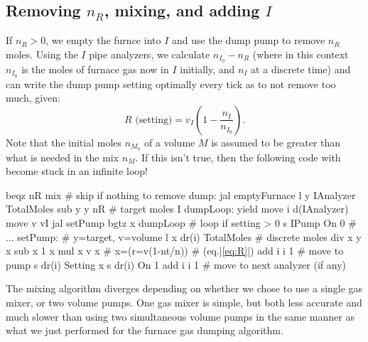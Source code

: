 \documentclass{article}
\begin{document}
\subsection{%
    Removing \texorpdfstring{$n_R$}{nR},
    mixing, and adding \texorpdfstring{$I$}{I}
}


\vspace{1em}
\begin{paracol}{2}
    If $n_R>0$, we empty the furnce into $I$ and use the dump pump to remove
    $n_R$ moles. Using the $I$ pipe analyzers, we calculate $n_{I_0}-n_R$
    (where in this context $n_{I_0}$ is the moles of furnace gas now in $I$
    initially, and $n_I$ at a discrete time)
    and can write the dump pump setting optimally every tick as to not remove
    too much, given:
    \begin{equation}\label{eq:R}
        R\text{ (setting)}=v_I\left(1-\frac{n_I}{n_{I_0}}\right).
    \end{equation}
    Note that the initial moles $n_{M_0}$ of a volume $M$ is assumed to be
    greater than what is needed in the mix $n_M$. If this isn't true, then the
    following code with become stuck in an infinite loop!
    \switchcolumn
    \begin{mips}
        beqz nR mix # skip if nothing to remove
        dump:
        jal emptyFurnace
        l y IAnalyzer TotalMoles
        sub y y nR # target moles I
        dumpLoop:
        yield
        move i d(IAnalyzer)
        move v vI
        jal setPump
        bgtz x dumpLoop # loop if setting > 0
        s IPump On 0
        # ...
        setPump: # y=target, v=volume
        l x dr(i) TotalMoles # discrete moles
        div x y x
        sub x 1 x
        mul x v x # x=(r=v(1-nt/n)) # (eq.|\ref{eq:R}|)
        add i i 1 # move to pump
        s dr(i) Setting x
        s dr(i) On 1
        add i i 1 # move to next analyzer (if any)
    \end{mips}
\end{paracol}
The mixing algorithm diverges depending on whether we chose to use a single
gas mixer, or two volume pumps. One gas mixer is simple, but both less accurate
and much slower than using two simultaneous volume pumps in the same manner as
what we just performed for the furnace gas dumping algorithm.
\vspace{1em}
\end{document}
